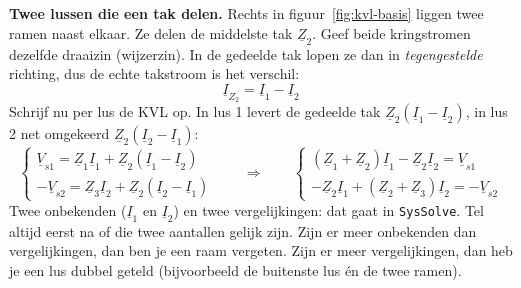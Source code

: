 \documentclass[a4paper,11pt]{article}
\begin{document}
\textbf{Twee lussen die een tak delen.} Rechts in figuur~\ref{fig:kvl-basis} liggen twee ramen naast
elkaar. Ze delen de middelste tak $\underline{Z}_2$. Geef beide kringstromen dezelfde draaizin
(wijzerzin). In de gedeelde tak lopen ze dan in \emph{tegengestelde} richting, dus de echte
takstroom is het verschil:
\[\underline{I}_{Z_2} = \underline{I}_1 - \underline{I}_2\]
Schrijf nu per lus de KVL op. In lus 1 levert de gedeelde tak
$\underline{Z}_2(\underline{I}_1 - \underline{I}_2)$, in lus 2 net omgekeerd
$\underline{Z}_2(\underline{I}_2 - \underline{I}_1)$:
\[\begin{cases}
        \underline{V}_{s1} = \underline{Z}_1\underline{I}_1 + \underline{Z}_2(\underline{I}_1 - \underline{I}_2) \\[1mm]
        -\underline{V}_{s2} = \underline{Z}_3\underline{I}_2 + \underline{Z}_2(\underline{I}_2 - \underline{I}_1)
    \end{cases}
    \qquad\Longrightarrow\qquad
    \begin{cases}
        (\underline{Z}_1+\underline{Z}_2)\underline{I}_1 - \underline{Z}_2\underline{I}_2 = \underline{V}_{s1} \\[1mm]
        -\underline{Z}_2\underline{I}_1 + (\underline{Z}_2+\underline{Z}_3)\underline{I}_2 = -\underline{V}_{s2}
    \end{cases}\]
Twee onbekenden ($\underline{I}_1$ en $\underline{I}_2$) en twee vergelijkingen: dat gaat in
\texttt{SysSolve}. Tel altijd eerst na of die twee aantallen gelijk zijn. Zijn er meer onbekenden
dan vergelijkingen, dan ben je een raam vergeten. Zijn er meer vergelijkingen, dan heb je een lus
dubbel geteld (bijvoorbeeld de buitenste lus \'en de twee ramen).
\end{document}
